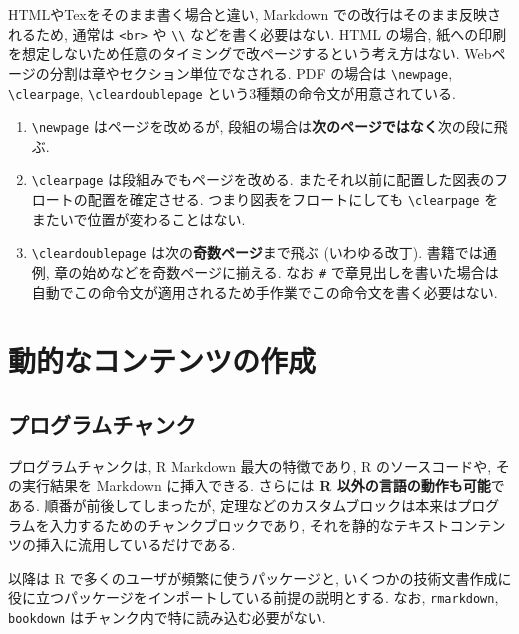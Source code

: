 \documentclass[
  xelatex,ja=standard,jafont=noto]{bxjsbook}
\providecommand{\tightlist}{%
  \setlength{\itemsep}{0pt}\setlength{\parskip}{0pt}}
\theoremstyle{definition}
\theoremstyle{definition}
\theoremstyle{definition}
\theoremstyle{definition}
\theoremstyle{remark}
\begin{document}
HTMLやTexをそのまま書く場合と違い, Markdown
での改行はそのまま反映されるため, 通常は
\texttt{\textless{}br\textgreater{}} や
\texttt{\textbackslash{}\textbackslash{}} などを書く必要はない. HTML
の場合,
紙への印刷を想定しないため任意のタイミングで改ページするという考え方はない.
Webページの分割は章やセクション単位でなされる. PDF の場合は
\texttt{\textbackslash{}newpage}, \texttt{\textbackslash{}clearpage},
\texttt{\textbackslash{}cleardoublepage}
という3種類の命令文が用意されている.

\begin{enumerate}
\def\labelenumi{\arabic{enumi}.}
\tightlist
\item
  \texttt{\textbackslash{}newpage} はページを改めるが,
  段組の場合は\textbf{次のページではなく}次の段に飛ぶ.
\item
  \texttt{\textbackslash{}clearpage} は段組みでもページを改める.
  またそれ以前に配置した図表のフロートの配置を確定させる.
  つまり図表をフロートにしても \texttt{\textbackslash{}clearpage}
  をまたいで位置が変わることはない.
\item
  \texttt{\textbackslash{}cleardoublepage}
  は次の\textbf{奇数ページ}まで飛ぶ (いわゆる改丁). 書籍では通例,
  章の始めなどを奇数ページに揃える. なお \texttt{\#}
  で章見出しを書いた場合は自動でこの命令文が適用されるため手作業でこの命令文を書く必要はない.
\end{enumerate}

\hypertarget{ux52d5ux7684ux306aux30b3ux30f3ux30c6ux30f3ux30c4ux306eux4f5cux6210}{%
\chapter{動的なコンテンツの作成}\label{ux52d5ux7684ux306aux30b3ux30f3ux30c6ux30f3ux30c4ux306eux4f5cux6210}}

\hypertarget{ux30d7ux30edux30b0ux30e9ux30e0ux30c1ux30e3ux30f3ux30af}{%
\section{プログラムチャンク}\label{ux30d7ux30edux30b0ux30e9ux30e0ux30c1ux30e3ux30f3ux30af}}

プログラムチャンクは, R Markdown 最大の特徴であり, R のソースコードや,
その実行結果を Markdown に挿入できる. さらには \textbf{R
以外の言語の動作も可能}である. 順番が前後してしまったが,
定理などのカスタムブロックは本来はプログラムを入力するためのチャンクブロックであり,
それを静的なテキストコンテンツの挿入に流用しているだけである.

以降は R で多くのユーザが頻繁に使うパッケージと,
いくつかの技術文書作成に役に立つパッケージをインポートしている前提の説明とする.
なお, \texttt{rmarkdown}, \texttt{bookdown}
はチャンク内で特に読み込む必要がない.
\end{document}
